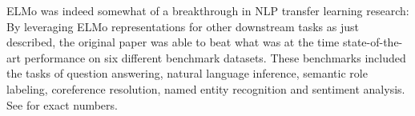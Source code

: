 ELMo was indeed somewhat of a breakthrough in NLP transfer learning research: By leveraging ELMo representations for other downstream tasks as just described, the original paper was able to beat what was at the time state-of-the-art performance on six different benchmark datasets. These benchmarks included the tasks of question answering, natural language inference, semantic role labeling, coreference resolution, named entity recognition and sentiment analysis. See  for exact numbers.